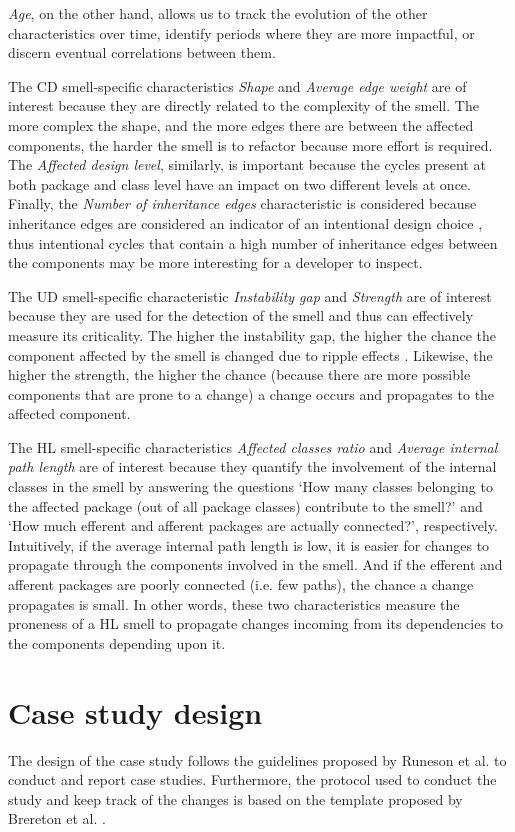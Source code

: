 \emph{Age}, on the other hand, allows us to track the evolution of the other characteristics over time, identify periods where they are more impactful, or discern eventual correlations between them.

The CD smell-specific characteristics \emph{Shape} and \emph{Average edge weight} are of interest because they are directly related to the complexity of the smell.
The more complex the shape, and the more edges there are between the affected components, the harder the smell is to refactor because more effort is required.
The \emph{Affected design level}, similarly, is important because the cycles present at both package and class level have an impact on two different levels at once.
Finally, the \emph{Number of inheritance edges} characteristic is considered because inheritance edges are considered an indicator of an intentional design choice \cite{Laval2012}, thus intentional cycles that contain a high number of inheritance edges between the components may be more interesting for a developer to inspect.

The UD smell-specific characteristic \emph{Instability gap} and \emph{Strength} are of interest because they are used for the detection of the smell and thus can effectively measure its criticality. The higher the instability gap, the higher the chance the component affected by the smell is changed due to ripple effects \cite{Martin2018}. Likewise, the higher the strength, the higher the chance (because there are more possible components that are prone to a change) a change occurs and propagates to the affected component.

The HL smell-specific characteristics \emph{Affected classes ratio} and \emph{Average internal path length} are of interest because they quantify the involvement of the internal classes in the smell by answering the questions `How many classes belonging to the affected package (out of all package classes) contribute to the smell?' and `How much efferent and afferent packages are actually connected?', respectively.
Intuitively, if the average internal path length is low, it is easier for changes to propagate through the components involved in the smell. And if the efferent and afferent packages are poorly connected (i.e. few paths), the chance a change propagates is small.
In other words, these two characteristics measure the proneness of a HL smell to propagate changes incoming from its dependencies to the components depending upon it.

\section{Case study design}\label{c3:sec:case-study}
The design of the case study follows the guidelines proposed by Runeson et al. \cite{Runeson2012} to conduct and report case studies.
Furthermore, the protocol used to conduct the study and keep track of the changes is based on the template proposed by Brereton et al. \cite{Brereton2008}.

